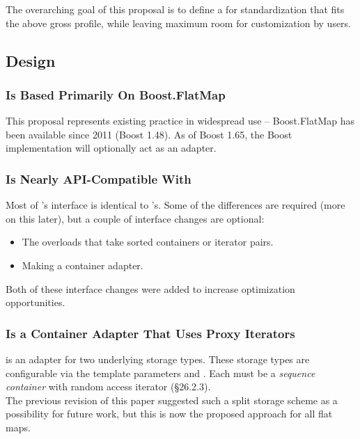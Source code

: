 The overarching goal of this proposal is to define a  for
standardization that fits the above gross profile, while leaving maximum room
for customization by users.

\subsection{Design}

\subsubsection{ Is Based Primarily On Boost.FlatMap}

This proposal represents existing practice in widespread use -- Boost.FlatMap
has been available since 2011 (Boost 1.48).  As of Boost 1.65, the Boost
implementation will optionally act as an adapter.

\subsubsection{ Is Nearly API-Compatible With }

Most of 's interface is identical to 's.  Some of the
differences are required (more on this later), but a couple of interface
changes are optional:

\begin{itemize}
  \item The overloads that take sorted containers or iterator pairs.

  \item Making  a container adapter.
\end{itemize}

Both of these interface changes were added to increase optimization
opportunities.

\subsubsection{ Is a Container Adapter That Uses Proxy Iterators}

 is an adapter for two underlying storage types.  These storage
types are configurable via the template parameters  and
.  Each must be a \textit{sequence container} with
random access iterator (\S26.2.3).\\

The previous revision of this paper suggested such a split storage scheme as a
possibility for future work, but this is now the proposed approach for all
flat maps.\\

